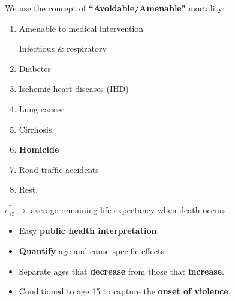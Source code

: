 \documentclass[xcolor={dvipsnames}]{beamer}
\begin{document}
\begin{frame}
\Large{
We use the concept of \textbf{``Avoidable/Amenable"} mortality:
		\begin{enumerate}
		
		
\color{blue} 		\item Amenable to medical intervention \begin{tiny}Infectious \& respiratory \end{tiny}

\pause

\color{ForestGreen}		\item Diabetes
		
		\item Ischemic heart diseases (IHD)
		
		\item Lung cancer.
		 
		\item Cirrhosis.
		
\pause
		
\color{red}		\item \textbf{Homicide}
		
\color{yellow}		\item Road traffic accidents
		
		\pause
		
\color{gray}				\item Rest.

		
		\end{enumerate}			

}
\end{frame}


\begin{frame}

\Large{
\textbf{$e^{\dagger}_{15}\longrightarrow  $ }average remaining life expectancy when death occurs.

\begin{itemize}
\item Easy \textbf{public health interpretation}.
\pause
\item \textbf{Quantify} age and cause specific effects.
\pause
\item Separate ages that \textbf{decrease} from those that \textbf{increase}.
\pause
\item Conditioned to age 15 to capture the \textbf{onset of violence}.
\end{itemize}

}
\end{frame}
\end{document}
